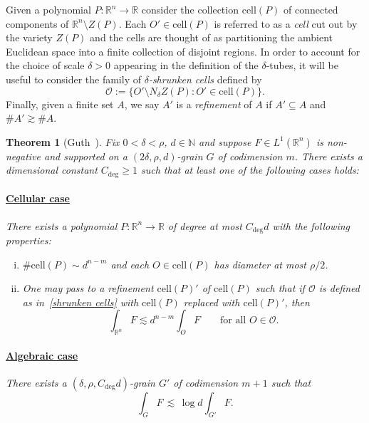 \documentclass[reqno]{amsart}
\numberwithin{equation}{section}
\newcommand{\N}{\mathbb{N}}
\newcommand{\R}{\mathbb{R}}
\newcommand{\cO}{\mathcal{O}}
\theoremstyle{plain}
\newtheorem{theorem}{Theorem}[section]
\theoremstyle{definition}
\newcommand{\cell}{\mathrm{cell}}
\begin{document}
Given a polynomial $P \colon \R^n \to \R$ consider the collection  $\cell(P)$  
 of connected components of $\R^n \setminus Z(P)$. Each $O' \in \cell(P)$ is referred to as a \emph{cell} cut out by the variety $Z(P)$ and the cells are thought of as partitioning the ambient Euclidean space into a finite collection of disjoint regions. In order to account for the choice of scale $\delta > 0$ appearing in the definition of the $\delta$-tubes, it will be useful to consider the family of \emph{$\delta$-shrunken cells} defined by
\begin{equation}\label{shrunken cells}
    \cO := \big\{ O'\setminus N_{\delta}Z(P) : O' \in \cell(P) \big\}.
\end{equation}
Finally, given a finite set $A$, we say $A'$ is a
\textit{refinement} of $A$ if $A' \subseteq A$ and $\# A' \gtrsim \# A$. 

\begin{theorem}[Guth~\cite{Guth2018}]\label{thm: partitioning} Fix $0 < \delta < \rho$, $d \in \N$ and suppose $F \in L^1(\R^n)$ is non-negative and supported on a $(2\delta, \rho, d)$-grain $G$ of codimension $m$. There exists a dimensional constant $C_{\deg} \geq 1$ such that at least one of the following cases holds:\medskip

\paragraph{\underline{Cellular case}} There exists a polynomial $P \colon \R^n \to \R$ of degree at most $C_{\deg} d$ with the following properties:
\begin{enumerate}[i)]
    \item $\#\cell(P) \sim d^{n-m}$ and each $O \in \cell(P)$ has diameter at most $\rho/2$.
    \item One may pass to a refinement $\cell(P)'$ of $\cell(P)$ such that if $\cO$ is defined as in~\eqref{shrunken cells} with $\cell(P)$ replaced with $\cell(P)'$, then 
    \begin{equation*}
        \int_{\R^n} F  \lesssim d^{n-m} \int_{O} F \qquad \textrm{for all $O \in \cO$.}
    \end{equation*}
\end{enumerate}  
\paragraph{\underline{Algebraic case}} There exists a $(\delta, \rho, C_{\deg} d)$-grain $G'$ of codimension $m+1$ such that
    \begin{equation*}
        \int_{G} F \,\lesssim\,\log d \int_{G'} F.
    \end{equation*}
\end{theorem}
\end{document}
